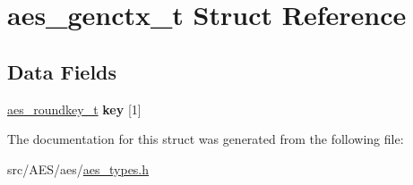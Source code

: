 \hypertarget{structaes__genctx__t}{\section{aes\+\_\+genctx\+\_\+t Struct Reference}
\label{structaes__genctx__t}
}
\subsection*{Data Fields}
\begin{DoxyCompactItemize}
\item 
\hypertarget{structaes__genctx__t_ad14597dc3319c5b64b7a5766962d1f5b}{\hyperlink{structaes__roundkey__t}{aes\+\_\+roundkey\+\_\+t} {\bfseries key} \mbox{[}1\mbox{]}}\label{structaes__genctx__t_ad14597dc3319c5b64b7a5766962d1f5b}

\end{DoxyCompactItemize}


The documentation for this struct was generated from the following file\+:\begin{DoxyCompactItemize}
\item 
src/\+A\+E\+S/aes/\hyperlink{aes__types_8h}{aes\+\_\+types.\+h}\end{DoxyCompactItemize}
